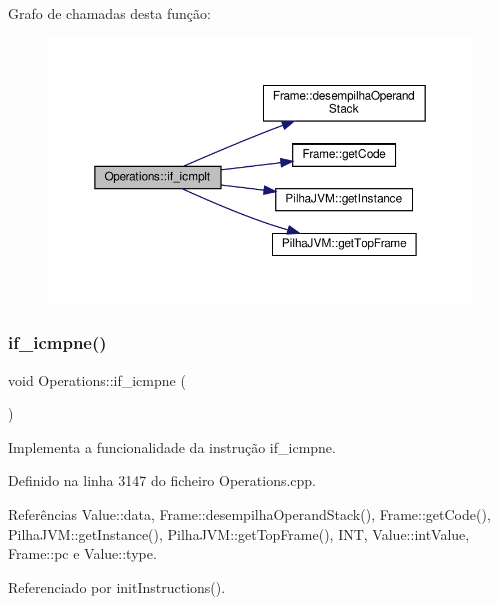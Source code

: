 Grafo de chamadas desta função\+:
\nopagebreak
\begin{figure}[H]
\begin{center}
\leavevmode
\includegraphics[width=350pt]{classOperations_a06f624059cfada3f4a726d0482078aaa_cgraph}
\end{center}
\end{figure}
\mbox{\label{classOperations_a52dca630766e37bbaf0e7439c0335273}} 
\subsubsection{\texorpdfstring{if\+\_\+icmpne()}{if\_icmpne()}}
{\footnotesize\ttfamily void Operations\+::if\+\_\+icmpne (\begin{DoxyParamCaption}{ }\end{DoxyParamCaption})\hspace{0.3cm}{\ttfamily [private]}}



Implementa a funcionalidade da instrução if\+\_\+icmpne. 



Definido na linha 3147 do ficheiro Operations.\+cpp.



Referências Value\+::data, Frame\+::desempilha\+Operand\+Stack(), Frame\+::get\+Code(), Pilha\+J\+V\+M\+::get\+Instance(), Pilha\+J\+V\+M\+::get\+Top\+Frame(), I\+NT, Value\+::int\+Value, Frame\+::pc e Value\+::type.



Referenciado por init\+Instructions().


